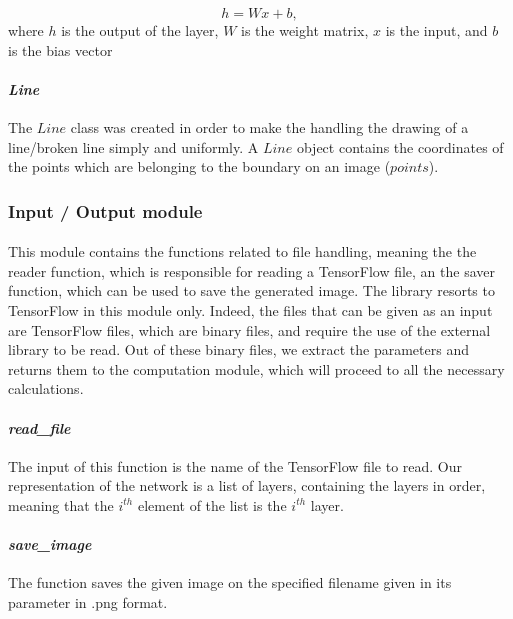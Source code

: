 \documentclass[a4paper]{article}
\begin{document}
\begin{equation}
h = W x + b,
\label{eq:layer_output}
\end{equation}
where $h$ is the output of the layer, $W$ is the weight matrix, $x$ is the input, and $b$ is the bias vector

\paragraph{\textit{Line}}
The $Line$ class was created in order to make the handling the drawing of a line/broken line simply and uniformly. A $Line$ object contains the coordinates of the points which are belonging to the boundary on an image ($points$). %


\subsubsection{Input / Output module}
\paragraph{}This module contains the functions related to file handling, meaning the the reader function, which is responsible for reading a TensorFlow file, an the saver function, which can be used to save the generated image. The library resorts to TensorFlow in this module only. Indeed, the files that can be given as an input are TensorFlow files, which are binary files, and require the use of the external library to be read. Out of these binary files, we extract the parameters and returns them to the computation module, which will proceed to all the necessary calculations.


\paragraph{\textit{read\_file}}
The input of this function is the name of the TensorFlow file to read. %
Our representation of the network is a list of layers, containing the layers in order, meaning that the $i^{th}$ element of the list is the $i^ {th}$ layer.

\paragraph{\textit{save\_image}}
The function saves the given image on the specified filename given in its parameter in .png format. %
\end{document}
